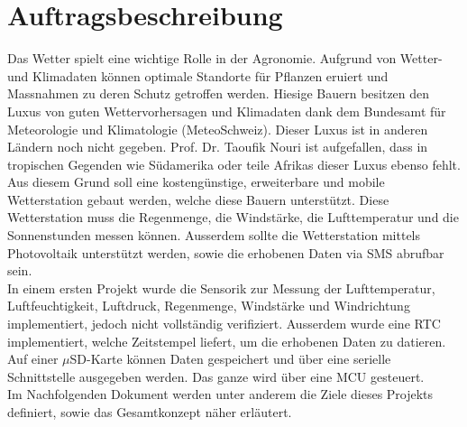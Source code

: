 \cleardoublepage
\thispagestyle{empty}
\section*{Auftragsbeschreibung}
Das Wetter spielt eine wichtige Rolle in der Agronomie. Aufgrund von Wetter- und Klimadaten können optimale Standorte für Pflanzen eruiert und Massnahmen zu deren Schutz getroffen werden. Hiesige Bauern besitzen den Luxus von guten Wettervorhersagen und Klimadaten dank dem Bundesamt für Meteorologie und Klimatologie (MeteoSchweiz). Dieser Luxus ist in anderen Ländern noch nicht gegeben. Prof. Dr. Taoufik Nouri ist aufgefallen, dass in tropischen Gegenden wie Südamerika oder teile Afrikas dieser Luxus ebenso fehlt. \\

Aus diesem Grund soll eine kostengünstige, erweiterbare und mobile Wetterstation gebaut werden, welche diese Bauern unterstützt. Diese Wetterstation muss die Regenmenge, die Windstärke, die Lufttemperatur und die Sonnenstunden messen können. Ausserdem sollte die Wetterstation mittels Photovoltaik unterstützt werden, sowie die erhobenen Daten via SMS abrufbar sein. \\

In einem ersten Projekt wurde die Sensorik zur Messung der Lufttemperatur, Luftfeuchtigkeit, Luftdruck, Regenmenge, Windstärke und Windrichtung implementiert, jedoch nicht vollständig verifiziert. Ausserdem wurde eine RTC implementiert, welche Zeitstempel liefert, um die erhobenen Daten zu datieren. Auf einer $\mu$SD-Karte können Daten gespeichert und über eine serielle Schnittstelle ausgegeben werden. Das ganze wird über eine MCU gesteuert. \\

Im Nachfolgenden Dokument werden unter anderem die Ziele dieses Projekts definiert, sowie das Gesamtkonzept näher erläutert. 

